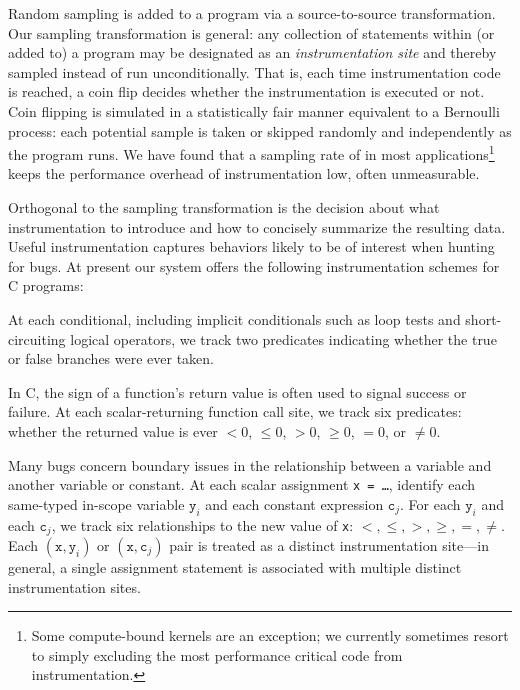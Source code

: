 \documentclass[preprint,final]{sigplanconf}
\begin{document}
Random sampling is added to a program via a source-to-source
transformation.  Our sampling transformation is general: any
collection of statements within (or added to) a program may be
designated as an {\em instrumentation site} and thereby sampled instead of run
unconditionally.  That is, each time instrumentation code is reached,
a coin flip decides whether the instrumentation is executed or not.
Coin flipping is simulated in a statistically fair manner equivalent
to a Bernoulli process: each potential sample is taken or skipped
randomly and independently as the program runs.  We have found that a
sampling rate of  in most applications\footnote{Some compute-bound kernels are an exception; we currently sometimes resort to simply
excluding the most performance critical code from instrumentation.} keeps the performance overhead of instrumentation low, often unmeasurable.

Orthogonal to the sampling transformation is the decision about what
instrumentation to introduce and how to concisely summarize the
resulting data.  Useful instrumentation captures behaviors likely to
be of interest when hunting for bugs.  At present our system offers
the following instrumentation schemes for C programs:

\begin{description}
\sloppy
\item[branches:] At each conditional, including implicit conditionals
such as loop tests and short-circuiting logical operators, we track two predicates
indicating whether the true or false branches were ever taken.

\item[returns:] In C, the
  sign of a function's return value is often used to signal success or failure.
  At each scalar-returning function call site, we track six predicates:
  whether the returned value is ever $< 0$, $\leq 0$, $> 0$, $\geq 0$,
  $= 0$, or $\neq 0$.

\item[scalar-pairs:] Many bugs
  concern boundary issues in the relationship between a
  variable and another variable or constant.  At
  each scalar assignment \texttt{x = \dots}, identify each
  same-typed in-scope variable $\mathtt{y}_i$ and each
  constant expression $\mathtt{c}_j$.  For each   $\mathtt{y}_i$ and each $\mathtt{c}_j$,
  we track six relationships to the new value of \texttt{x}: $<, \leq, >, \geq, =, \neq$.
  Each $(\mathtt{x}, \mathtt{y}_i)$ or $(\mathtt{x}, \mathtt{c}_j)$ pair
  is treated as a distinct instrumentation site---in general, a single assignment statement is associated with multiple distinct instrumentation sites.
\end{description}
\end{document}

